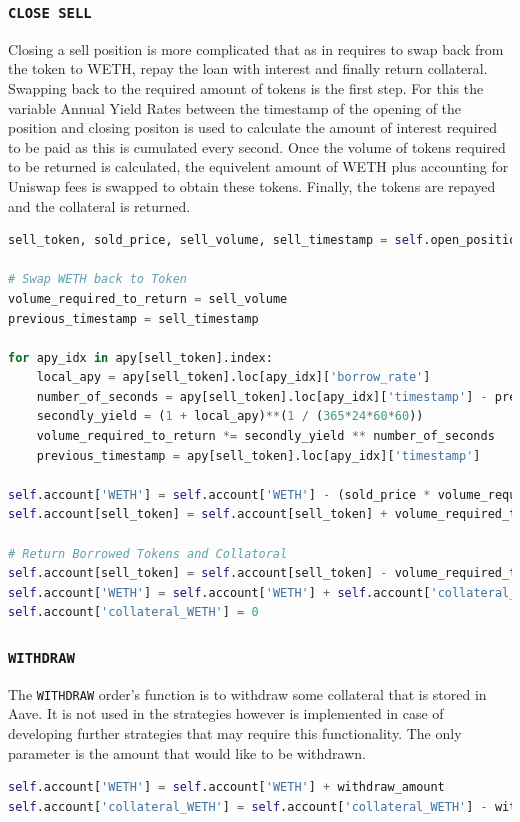 \subsubsection{\texttt{CLOSE\ SELL}}
Closing a sell position is more complicated that as in requires to swap back from the token to WETH, repay the loan with interest and finally return collateral. Swapping back to the required amount of tokens is the first step. For this the variable Annual Yield Rates between the timestamp of the opening of the position and closing positon is used to calculate the amount of interest required to be paid as this is cumulated every second. Once the volume of tokens required to be returned is calculated, the equivelent amount of WETH plus accounting for Uniswap fees is swapped to obtain these tokens. Finally, the tokens are repayed and the collateral is returned.
\vspace{5mm}
\begin{lstlisting}[language=Python]
sell_token, sold_price, sell_volume, sell_timestamp = self.open_positions['SELL'][sell_id]

# Swap WETH back to Token
volume_required_to_return = sell_volume
previous_timestamp = sell_timestamp

for apy_idx in apy[sell_token].index:
    local_apy = apy[sell_token].loc[apy_idx]['borrow_rate']
    number_of_seconds = apy[sell_token].loc[apy_idx]['timestamp'] - previous_timestamp
    secondly_yield = (1 + local_apy)**(1 / (365*24*60*60))
    volume_required_to_return *= secondly_yield ** number_of_seconds
    previous_timestamp = apy[sell_token].loc[apy_idx]['timestamp']

self.account['WETH'] = self.account['WETH'] - (sold_price * volume_required_to_return / (1 - swap_fees[sell_token])) 
self.account[sell_token] = self.account[sell_token] + volume_required_to_return

# Return Borrowed Tokens and Collatoral
self.account[sell_token] = self.account[sell_token] - volume_required_to_return
self.account['WETH'] = self.account['WETH'] + self.account['collateral_WETH']
self.account['collateral_WETH'] = 0
\end{lstlisting}

\subsubsection{\texttt{WITHDRAW}}
The \texttt{WITHDRAW} order's function is to withdraw some collateral that is stored in Aave. It is not used in the strategies however is implemented in case of developing further strategies that may require this functionality. The only parameter is the amount that would like to be withdrawn.
\vspace{5mm}
\begin{lstlisting}[language=Python]
self.account['WETH'] = self.account['WETH'] + withdraw_amount
self.account['collateral_WETH'] = self.account['collateral_WETH'] - withdraw_amount
\end{lstlisting}

